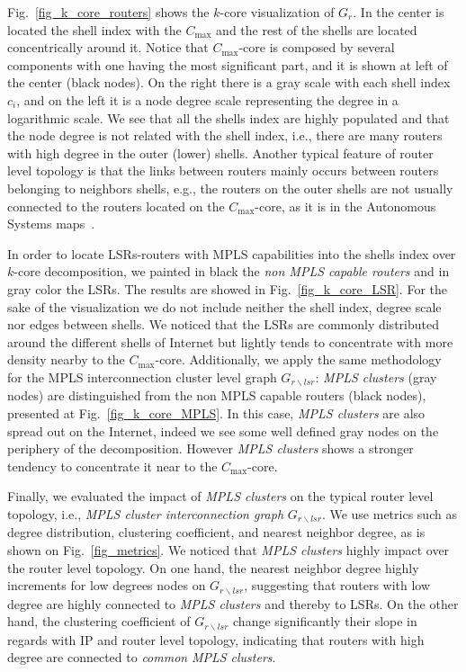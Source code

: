 Fig.~\ref{fig_k_core_routers} shows the $k$-core visualization of $G_{r}$.
In the center is located the shell index with the $C_{\max}$  and the rest of
the shells are located concentrically around it. Notice that $C_{\max}$-core is
composed by several components with one having the most significant part, and it
is shown at left of the center (black nodes). On the right there is a gray scale
with each shell index $c_i$, and on the left it is a node degree scale
representing the degree in a logarithmic scale. We see that all the shells index
are highly populated and that the node degree is not related with the shell
index, i.e., there are many routers with high degree in the outer (lower)
shells.  Another typical feature of router level topology is that the links
between routers mainly occurs between routers belonging to neighbors shells,
e.g., the routers on the outer shells are not usually connected to the routers
located on the  $C_{\max}$-core, as it is in the Autonomous Systems
maps~\cite{Alvarez06k}.

In order to locate LSRs-routers with MPLS capabilities into the shells index
over $k$-core decomposition, we painted in black the \textit{non MPLS capable
routers} and in gray color the LSRs. The results are showed in
Fig.~\ref{fig_k_core_LSR}.  For the sake of the visualization we do not include
neither the shell index, degree scale nor edges between shells. We noticed that
the LSRs are commonly distributed around the different shells of Internet but
lightly tends to concentrate with more density nearby to the $C_{\max}$-core.
Additionally, we apply the same methodology for the MPLS interconnection cluster
level graph $G_{r\backslash lsr}$: \textit{MPLS clusters} (gray nodes) are
distinguished from the non MPLS capable routers (black nodes), presented at
Fig.~\ref{fig_k_core_MPLS}. In this case,  \textit{MPLS clusters}  are also
spread out on the Internet, indeed we see some well defined gray nodes on the
periphery of the decomposition. However \textit{MPLS clusters} shows a stronger
tendency to concentrate it near to the $C_{\max}$-core.

Finally, we evaluated the impact of \textit{MPLS clusters} on the typical router
level topology, i.e., \textit{MPLS cluster interconnection graph} $G_{r
\backslash lsr }$. We use metrics such as degree distribution, clustering
coefficient, and nearest neighbor degree, as is shown on Fig.~\ref{fig_metrics}.
We noticed that \textit{MPLS clusters} highly impact over the router level
topology. On one hand, the nearest neighbor degree highly increments for low
degrees nodes on $G_{r \backslash lsr }$, suggesting that routers with low
degree are highly connected to \textit{MPLS clusters} and thereby to LSRs.
On the other hand, the clustering coefficient of $G_{r \backslash lsr }$ change
significantly their slope in regards with IP and router level topology,
indicating that routers with high degree are connected to \textit{common}
\textit{MPLS clusters}.

